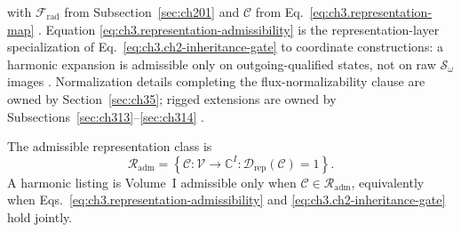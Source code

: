 with \(\mathcal{F}_{\mathrm{rad}}\) from Subsection~\ref{sec:ch201} and \(\mathcal{C}\) from
Eq.~\eqref{eq:ch3.representation-map} \cite{stratton1941}. Equation
\eqref{eq:ch3.representation-admissibility} is the representation-layer specialization of
Eq.~\eqref{eq:ch3.ch2-inheritance-gate} to coordinate constructions: a harmonic expansion is
admissible only on outgoing-qualified states, not on raw \(\mathcal{S}_\omega\) images
\cite{stratton1941}. Normalization details completing the flux-normalizability clause are owned by
Section~\ref{sec:ch35}; rigged extensions are owned by Subsections~\ref{sec:ch313}--\ref{sec:ch314}
\cite{harrington2001}.
\begin{definition}
\label{def:ch3.R-adm}
The admissible representation class is
\begin{equation}
\label{eq:ch3.R-adm-class}
\mathcal{R}_{\mathrm{adm}}
=
\left\{
\mathcal{C}:\mathcal{V}\to\mathbb{C}^{I}:
\mathcal{D}_{\mathrm{rep}}(\mathcal{C})=1
\right\}.
\end{equation}
A harmonic listing is Volume~I admissible only when \(\mathcal{C}\in\mathcal{R}_{\mathrm{adm}}\),
equivalently when Eqs.~\eqref{eq:ch3.representation-admissibility} and
\eqref{eq:ch3.ch2-inheritance-gate} hold jointly.
\end{definition}
